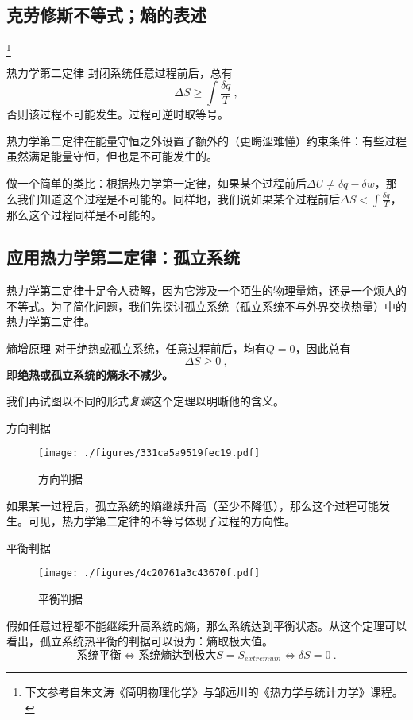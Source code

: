 \subsection{克劳修斯不等式；熵的表述}\label{sub_Td2Law_3}
\footnote{下文参考自朱文涛《简明物理化学》与邹远川的《热力学与统计力学》课程。}

\begin{theorem}{热力学第二定律}
封闭系统任意过程前后，总有
\begin{equation}
\Delta S \ge \int \frac{\delta q}{T}~,
\end{equation}
否则该过程不可能发生。过程可逆时取等号。
\end{theorem}
热力学第二定律在能量守恒之外设置了额外的（更晦涩难懂）约束条件：有些过程虽然满足能量守恒，但也是不可能发生的。

做一个简单的类比：根据热力学第一定律，如果某个过程前后$\Delta U \ne \delta q - \delta w$，那么我们知道这个过程是不可能的。同样地，我们说如果某个过程前后$\Delta S < \int \frac{\delta q}{T}$，那么这个过程同样是不可能的。

\subsection{应用热力学第二定律：孤立系统}
热力学第二定律十足令人费解，因为它涉及一个陌生的物理量熵，还是一个烦人的不等式。为了简化问题，我们先探讨孤立系统（孤立系统不与外界交换热量）中的热力学第二定律。
\begin{corollary}{熵增原理}
对于绝热或孤立系统，任意过程前后，均有$Q=0$，因此总有 $$\Delta S \ge 0~,$$
即\textbf{绝热或孤立系统的熵永不减少。}
\end{corollary}
我们再试图以不同的形式\textsl{复读}这个定理以明晰他的含义。

\begin{corollary}{方向判据}
\begin{figure}[ht]
\centering
\texttt{[image: ./figures/331ca5a9519fec19.pdf]}
\caption{方向判据} \label{fig_Td2Law_1}
\end{figure}
如果某一过程后，孤立系统的熵继续升高（至少不降低），那么这个过程可能发生。可见，热力学第二定律的不等号体现了过程的方向性。
\end{corollary}

\begin{corollary}{平衡判据}
\begin{figure}[ht]
\centering
\texttt{[image: ./figures/4c20761a3c43670f.pdf]}
\caption{平衡判据} \label{fig_Td2Law_2}
\end{figure}
假如任意过程都不能继续升高系统的熵，那么系统达到平衡状态。从这个定理可以看出，孤立系统热平衡的判据可以设为：熵取极大值。
$$\text{系统平衡} \Leftrightarrow \text{系统熵达到极大} S=S_{extremum} \Leftrightarrow \delta S = 0~.$$
\end{corollary}

